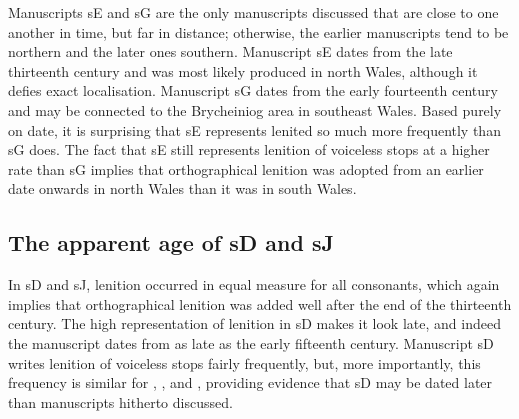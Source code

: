 Manuscripts \gls{sE} and \gls{sG} are the only manuscripts discussed that are close to one another in time, but far in distance; otherwise, the earlier manuscripts tend to be northern and the later ones southern.
Manuscript \gls{sE} dates from the late thirteenth century and was most likely produced in north Wales, although it defies exact localisation. Manuscript \gls{sG} dates from the early fourteenth century and may be connected to the Brycheiniog area in southeast Wales. Based purely on date, it is surprising that \gls{sE} represents lenited  so much more frequently than \gls{sG} does. The fact that \gls{sE} still represents lenition of voiceless stops at a higher rate than \gls{sG} implies that orthographical lenition was adopted from an earlier date onwards in north Wales than it was in south Wales.

\subsection{The apparent age of \gls{sD} and \gls{sJ}}
\label{sec:apparent-age-glssd}

In \gls{sD} and \gls{sJ}, lenition occurred in equal measure for all consonants, which again implies that orthographical lenition was added well after the end of the thirteenth century. 
The high representation of lenition in \gls{sD} makes it look late, and indeed the manuscript dates from as late as the early fifteenth century. Manuscript \gls{sD} writes lenition of voiceless stops fairly frequently, but, more importantly, this frequency is similar for , , and , providing evidence that \gls{sD} may be dated later than manuscripts hitherto discussed.

